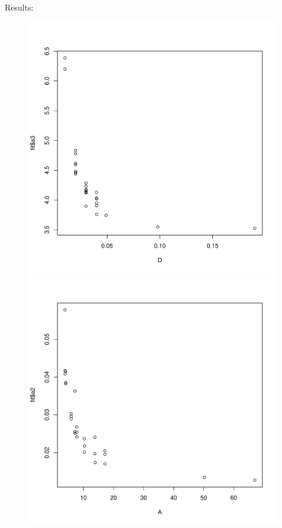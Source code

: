 \documentclass[12pt, handout=show,notes=show]{beamer}
\begin{document}
\begin{frame}{Results: }
    \begin{figure}[h]
	\begin{center}
	    \includegraphics[height=.4\textheight]{images/densRes.pdf}\\
	    \includegraphics[height=.4\textheight]{images/distRes.pdf}
	\end{center}
	\label{fig:meancurve}
    \end{figure}

\end{frame}
    
\end{document}
